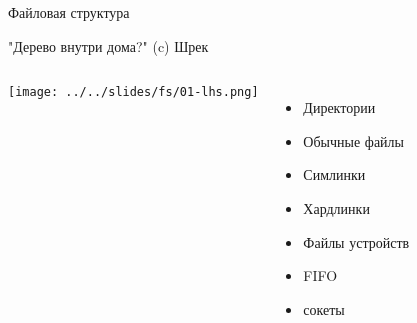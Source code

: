 \begin{frame}{Файловая структура}
	
	{\center "Дерево внутри дома?" (c) Шрек}
		
	\begin{columns}
		\texttt{[image: ../../slides/fs/01-lhs.png]}
		
		\begin{itemize}
			\item Директории
			\item Обычные файлы
			\item Симлинки
			\item Хардлинки
			\item Файлы устройств
			\item FIFO
			\item сокеты
		\end{itemize}
	\end{columns}
\end{frame}
